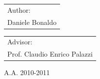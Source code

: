 \begin{titlepage}
    \begin{tabular}{l}
        Author:\\
        Daniele Bonaldo\\
    \end{tabular}
    \hfill
    \begin{tabular}{l}
        Advisor:\\
        Prof. Claudio Enrico Palazzi\\
    \end{tabular}
    \vfill
    \vspace{0.5cm}
        \begin{center}
            A.A. 2010-2011 \\
        \end{center}
\end{titlepage}

\clearpage{\pagestyle{empty}\cleardoublepage}
